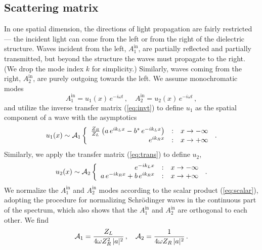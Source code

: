 \documentclass[12pt,amsmath,amssymb]{article}
\numberwithin{equation}{section}
\begin{document}
\subsection{Scattering matrix}

In one spatial dimension, the directions of light propagation are fairly
restricted
--- the incident light can come from the left or from the right of the
dielectric structure.
Waves incident from the left, $A_1^\mathrm{in}$, are partially reflected
and partially transmitted, but beyond the structure the waves must
propagate to the right.
(We drop the mode index $k$ for simplicity.)
Similarly, waves coming from the right, $A_2^\mathrm{in}$,
are purely outgoing towards the left.
We assume monochromatic modes
\begin{equation}
A_1^\mathrm{in} = u_1(x)\,e^{-i\omega t} \,,\quad
A_2^\mathrm{in} = u_2(x)\,e^{-i\omega t} \,,
\end{equation}
and utilize the inverse transfer matrix (\ref{eq:invt}) to define $u_1$
as the spatial component of a wave with the asymptotics
\begin{equation}
\label{eq:as1}
u_1(x) \sim {\cal A}_1
\left\{
\begin{array}{r@{\quad:\quad}l}
\frac{Z_R}{Z_L}\left(a\,e^{ik_Lx} - b^*\,e^{-ik_Lx}\right)
& x \rightarrow -\infty \\
e^{ik_Rx} & x \rightarrow +\infty
\end{array}
\right.
\,.
\end{equation}
Similarly, we apply the transfer matrix (\ref{eq:trans}) to define $u_2$,
\begin{equation}
\label{eq:as2}
u_2(x) \sim {\cal A}_2
\left\{
\begin{array}{r@{\quad:\quad}l}
e^{-ik_Lx} & x \rightarrow -\infty\\
a\,e^{-ik_Rx} + b\,e^{ik_Rx}
& x \rightarrow +\infty
\end{array}
\right.
\,.
\end{equation}
We normalize the $A_1^\mathrm{in}$ and $A_2^\mathrm{in}$ modes
according to the scalar product (\ref{eq:scalar}), adopting the procedure
\cite{LL3} for normalizing Schr\"odinger waves in the continuous part
of the spectrum, which also shows that the $A_1^\mathrm{in}$ and
$A_2^\mathrm{in}$ are orthogonal to each other. We find
\begin{equation}
{\cal A}_1 = \frac{Z_L}{4\omega Z_R^2\,|a|^2}\,,\quad
{\cal A}_2 = \frac{1}{4\omega Z_R\,|a|^2}\,.
\end{equation}
\end{document}
